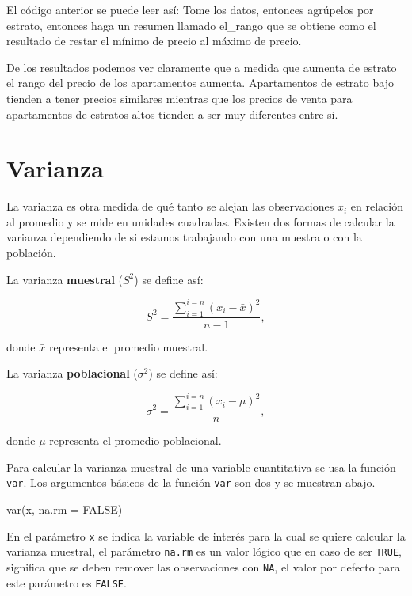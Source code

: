 \documentclass[
]{book}
\makeatletter
\newenvironment{Shaded}{\begin{snugshade}}{\end{snugshade}}
\newcommand{\AttributeTok}[1]{\textcolor[rgb]{0.77,0.63,0.00}{#1}}
\newcommand{\ConstantTok}[1]{\textcolor[rgb]{0.00,0.00,0.00}{#1}}
\newcommand{\FunctionTok}[1]{\textcolor[rgb]{0.00,0.00,0.00}{#1}}
\newcommand{\NormalTok}[1]{#1}
\newenvironment{kframe}{%
\medskip{}
\setlength{\fboxsep}{.8em}
 \def\at@end@of@kframe{}%
 \ifinner\ifhmode%
  \def\at@end@of@kframe{\end{minipage}}%
  \begin{minipage}{\columnwidth}%
 \fi\fi%
 \def\FrameCommand##1{\hskip\@totalleftmargin \hskip-\fboxsep
 \colorbox{shadecolor}{##1}\hskip-\fboxsep
     \hskip-\linewidth \hskip-\@totalleftmargin \hskip\columnwidth}%
 \MakeFramed {\advance\hsize-\width
   \@totalleftmargin\z@ \linewidth\hsize
   \@setminipage}}%
 {\par\unskip\endMakeFramed%
 \at@end@of@kframe}
\renewenvironment{Shaded}{\begin{kframe}}{\end{kframe}}
\newenvironment{rmdblock}[1]
  {
  \begin{itemize}
  \renewcommand{\labelitemi}{
    \raisebox{-.7\height}[0pt][0pt]{
      {\setkeys{Gin}{width=3em,keepaspectratio}\texttt{[image: images/\#1]}}
    }
  }
  \setlength{\fboxsep}{1em}
  \begin{kframe}
  \item
  }
  {
  \end{kframe}
  \end{itemize}
  }
\newenvironment{rmdnote}
  {\begin{rmdblock}{note}}
  {\end{rmdblock}}
\makeatother
\begin{document}
\begin{rmdnote}
El código anterior se puede leer así: Tome los datos, entonces agrúpelos por estrato, entonces haga un resumen llamado el\_rango que se obtiene como el resultado de restar el mínimo de precio al máximo de precio.
\end{rmdnote}

De los resultados podemos ver claramente que a medida que aumenta de estrato el rango del precio de los apartamentos aumenta. Apartamentos de estrato bajo tienden a tener precios similares mientras que los precios de venta para apartamentos de estratos altos tienden a ser muy diferentes entre si.

\hypertarget{varianza}{%
\section{Varianza}\label{varianza}}

La varianza es otra medida de qué tanto se alejan las observaciones \(x_i\) en relación al promedio y se mide en unidades cuadradas. Existen dos formas de calcular la varianza dependiendo de si estamos trabajando con una muestra o con la población.

La varianza \textbf{muestral} (\(S^2\)) se define así:

\[
S^2=\frac{\sum_{i=1}^{i=n}(x_i-\bar{x})^2}{n-1},
\]

donde \(\bar{x}\) representa el promedio muestral.

La varianza \textbf{poblacional} (\(\sigma^2\)) se define así:

\[
\sigma^2=\frac{\sum_{i=1}^{i=n}(x_i-\mu)^2}{n},
\]

donde \(\mu\) representa el promedio poblacional.

Para calcular la varianza muestral de una variable cuantitativa se usa la función \texttt{var}. Los argumentos básicos de la función \texttt{var} son dos y se muestran abajo.

\begin{Shaded}
\begin{Highlighting}[]
\FunctionTok{var}\NormalTok{(x, }\AttributeTok{na.rm =} \ConstantTok{FALSE}\NormalTok{)}
\end{Highlighting}
\end{Shaded}

En el parámetro \texttt{x} se indica la variable de interés para la cual se quiere calcular la varianza muestral, el parámetro \texttt{na.rm} es un valor lógico que en caso de ser \texttt{TRUE}, significa que se deben remover las observaciones con \texttt{NA}, el valor por defecto para este parámetro es \texttt{FALSE}.
\end{document}
